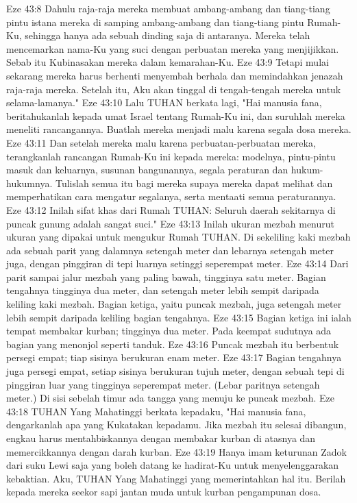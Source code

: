 Eze 43:8  Dahulu raja-raja mereka membuat ambang-ambang dan tiang-tiang pintu istana mereka di samping ambang-ambang dan tiang-tiang pintu Rumah-Ku, sehingga hanya ada sebuah dinding saja di antaranya. Mereka telah mencemarkan nama-Ku yang suci dengan perbuatan mereka yang menjijikkan. Sebab itu Kubinasakan mereka dalam kemarahan-Ku.
Eze 43:9  Tetapi mulai sekarang mereka harus berhenti menyembah berhala dan memindahkan jenazah raja-raja mereka. Setelah itu, Aku akan tinggal di tengah-tengah mereka untuk selama-lamanya."
Eze 43:10  Lalu TUHAN berkata lagi, "Hai manusia fana, beritahukanlah kepada umat Israel tentang Rumah-Ku ini, dan suruhlah mereka meneliti rancangannya. Buatlah mereka menjadi malu karena segala dosa mereka.
Eze 43:11  Dan setelah mereka malu karena perbuatan-perbuatan mereka, terangkanlah rancangan Rumah-Ku ini kepada mereka: modelnya, pintu-pintu masuk dan keluarnya, susunan bangunannya, segala peraturan dan hukum-hukumnya. Tulislah semua itu bagi mereka supaya mereka dapat melihat dan memperhatikan cara mengatur segalanya, serta mentaati semua peraturannya.
Eze 43:12  Inilah sifat khas dari Rumah TUHAN: Seluruh daerah sekitarnya di puncak gunung adalah sangat suci."
Eze 43:13  Inilah ukuran mezbah menurut ukuran yang dipakai untuk mengukur Rumah TUHAN. Di sekeliling kaki mezbah ada sebuah parit yang dalamnya setengah meter dan lebarnya setengah meter juga, dengan pinggiran di tepi luarnya setinggi seperempat meter.
Eze 43:14  Dari parit sampai jalur mezbah yang paling bawah, tingginya satu meter. Bagian tengahnya tingginya dua meter, dan setengah meter lebih sempit daripada keliling kaki mezbah. Bagian ketiga, yaitu puncak mezbah, juga setengah meter lebih sempit daripada keliling bagian tengahnya.
Eze 43:15  Bagian ketiga ini ialah tempat membakar kurban; tingginya dua meter. Pada keempat sudutnya ada bagian yang menonjol seperti tanduk.
Eze 43:16  Puncak mezbah itu berbentuk persegi empat; tiap sisinya berukuran enam meter.
Eze 43:17  Bagian tengahnya juga persegi empat, setiap sisinya berukuran tujuh meter, dengan sebuah tepi di pinggiran luar yang tingginya seperempat meter. (Lebar paritnya setengah meter.) Di sisi sebelah timur ada tangga yang menuju ke puncak mezbah.
Eze 43:18  TUHAN Yang Mahatinggi berkata kepadaku, "Hai manusia fana, dengarkanlah apa yang Kukatakan kepadamu. Jika mezbah itu selesai dibangun, engkau harus mentahbiskannya dengan membakar kurban di atasnya dan memercikkannya dengan darah kurban.
Eze 43:19  Hanya imam keturunan Zadok dari suku Lewi saja yang boleh datang ke hadirat-Ku untuk menyelenggarakan kebaktian. Aku, TUHAN Yang Mahatinggi yang memerintahkan hal itu. Berilah kepada mereka seekor sapi jantan muda untuk kurban pengampunan dosa.
